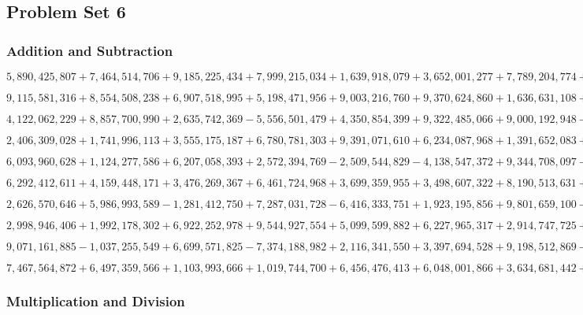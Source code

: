 \hypertarget{problem-set-6-6}{%
\subsection{Problem Set 6}\label{problem-set-6-6}}

\hypertarget{addition-and-subtraction-386}{%
\subsubsection{Addition and
Subtraction}\label{addition-and-subtraction-386}}

\(5,890,425,807+7,464,514,706+9,185,225,434+7,999,215,034+1,639,918,079+3,652,001,277+7,789,204,774+9,695,231,254+2,620,118,195+4,908,515,141\)

\(9,115,581,316+8,554,508,238+6,907,518,995+5,198,471,956+9,003,216,760+9,370,624,860+1,636,631,108+9,641,948,163+5,499,039,078+2,688,771,220\)

\(4,122,062,229+8,857,700,990+2,635,742,369-5,556,501,479+4,350,854,399+9,322,485,066+9,000,192,948-9,388,224,393 -8,062,983,947-8,305,356,834\)

\(2,406,309,028+1,741,996,113+3,555,175,187+6,780,781,303+9,391,071,610+6,234,087,968+1,391,652,083+7,830,080,796+9,226,144,130+8,742,749,566\)

\(6,093,960,628+1,124,277,586+6,207,058,393+2,572,394,769-2,509,544,829-4,138,547,372+9,344,708,097-5,394,869,096+4,791,799,950-6,793,711,068\)

\(6,292,412,611+4,159,448,171+3,476,269,367+6,461,724,968+3,699,359,955+3,498,607,322+8,190,513,631+7,003,806,438+1,498,062,871+2,874,485,378\)

\(2,626,570,646+5,986,993,589-1,281,412,750+7,287,031,728-6,416,333,751+1,923,195,856+9,801,659,100-4,299,319,586-7,025,338,873+6,664,325,830\)

\(2,998,946,406+1,992,178,302+6,922,252,978+9,544,927,554+5,099,599,882+6,227,965,317+2,914,747,725+2,492,681,261+8,435,369,210+1,552,564,041\)

\(9,071,161,885-1,037,255,549+6,699,571,825-7,374,188,982+2,116,341,550+3,397,694,528+9,198,512,869-6,107,945,775-5,821,591,817+2,177,843,205\)

\(7,467,564,872+6,497,359,566+1,103,993,666+1,019,744,700+6,456,476,413+6,048,001,866+3,634,681,442+7,088,700,117+3,657,337,745+4,749,487,354\)

\hypertarget{multiplication-and-division-384}{%
\subsubsection{Multiplication and
Division}\label{multiplication-and-division-384}}

